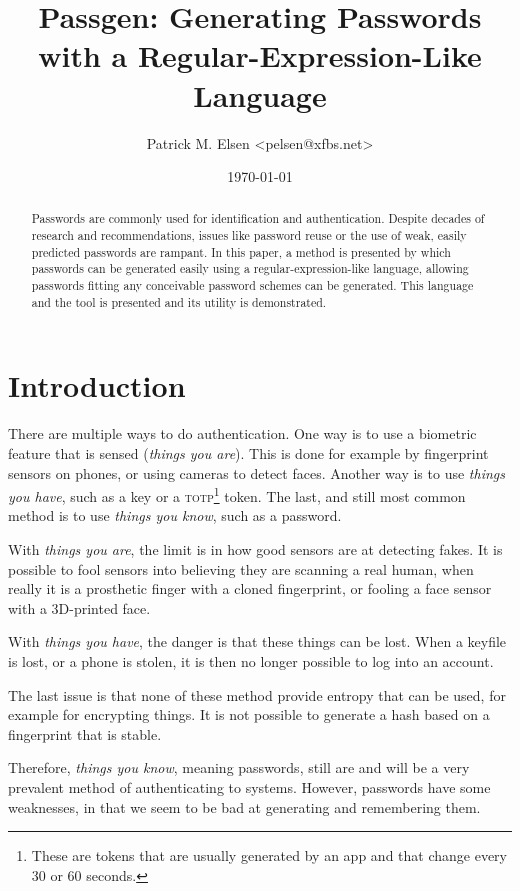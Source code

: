 \documentclass[a4paper,twocolumn]{article}
\title{Passgen: Generating Passwords with a Regular-Expression-Like Language}
\author{Patrick M. Elsen <pelsen@xfbs.net>}
\date{\today}
\begin{document}
\maketitle
\begin{abstract}
	Passwords are commonly used for identification and authentication. Despite decades of research and recommendations, issues like password reuse or the use of weak, easily predicted passwords are rampant. In this paper, a method is presented by which passwords can be generated easily using a regular-expression-like language, allowing passwords fitting any conceivable password schemes can be generated. This language and the tool is presented and its utility is demonstrated. 
\end{abstract}


\section{Introduction}

There are multiple ways to do authentication. One way is to use a biometric feature that is sensed (\emph{things you are}). This is done for example by fingerprint sensors on phones, or using cameras to detect faces. Another way is to use \emph{things you have}, such as a key or a \textsc{totp}\footnote{These are tokens that are usually generated by an app and that change every 30 or 60 seconds.} token. The last, and still most common method is to use \emph{things you know}, such as a password.

With \emph{things you are}, the limit is in how good sensors are at detecting fakes. It is possible to fool sensors into believing they are scanning a real human, when really it is a prosthetic finger with a cloned fingerprint, or fooling a face sensor with a 3D-printed face.

With \emph{things you have}, the danger is that these things can be lost. When a keyfile is lost, or a phone is stolen, it is then no longer possible to log into an account.

The last issue is that none of these method provide entropy that can be used, for example for encrypting things. It is not possible to generate a hash based on a fingerprint that is stable. 

Therefore, \emph{things you know}, meaning passwords, still are and will be a very prevalent method of authenticating to systems. However, passwords have some weaknesses, in that we seem to be bad at generating and remembering them.
\end{document}
